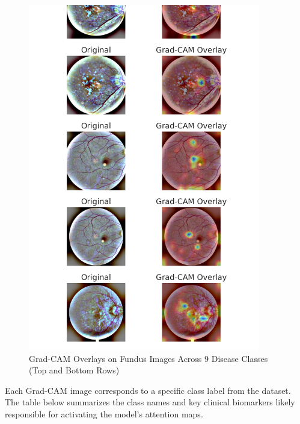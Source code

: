 \documentclass[a4paper,12pt]{report}
\begin{document}
\begin{figure}[h!]
    \centering
    \includegraphics[width=0.9\textwidth]{Down.png}
    \caption{Grad-CAM Overlays on Fundus Images Across 9 Disease Classes (Top and Bottom Rows)}
    \label{fig:gradcam_overlay}
\end{figure}

Each Grad-CAM image corresponds to a specific class label from the dataset. The table below summarizes the class names and key clinical biomarkers likely responsible for activating the model’s attention maps.
\end{document}
